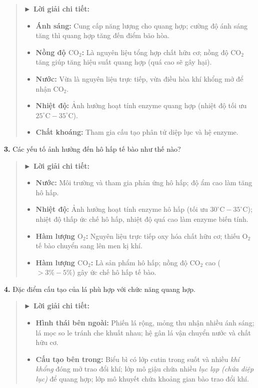 \documentclass[11pt,a4paper]{article}
\begin{document}
\begin{quote}\small
{\color{myBlue}\textbf{► Lời giải chi tiết:}}
\begin{itemize}[leftmargin=*,itemsep=1pt]
  \item \textbf{Ánh sáng:} Cung cấp năng lượng cho quang hợp; cường độ ánh sáng tăng thì quang hợp tăng đến điểm bão hòa.
  \item \textbf{Nồng độ $\text{CO}_2$:} Là nguyên liệu tổng hợp chất hữu cơ; nồng độ $\text{CO}_2$ tăng giúp tăng hiệu suất quang hợp (quá cao sẽ gây hại).
  \item \textbf{Nước:} Vừa là nguyên liệu trực tiếp, vừa điều hòa khí khổng mở để nhận $\text{CO}_2$.
  \item \textbf{Nhiệt độ:} Ảnh hưởng hoạt tính enzyme quang hợp (nhiệt độ tối ưu $25^\circ\text{C} - 35^\circ\text{C}$).
  \item \textbf{Chất khoáng:} Tham gia cấu tạo phân tử diệp lục và hệ enzyme.
\end{itemize}
\end{quote}

\textbf{3.} Các yếu tố ảnh hưởng đến hô hấp tế bào như thế nào?

\begin{quote}\small
{\color{myBlue}\textbf{► Lời giải chi tiết:}}
\begin{itemize}[leftmargin=*,itemsep=1pt]
  \item \textbf{Nước:} Môi trường và tham gia phản ứng hô hấp; độ ẩm cao làm tăng hô hấp.
  \item \textbf{Nhiệt độ:} Ảnh hưởng hoạt tính enzyme hô hấp (tối ưu $30^\circ\text{C} - 35^\circ\text{C}$); nhiệt độ thấp ức chế hô hấp, nhiệt độ quá cao làm enzyme biến tính.
  \item \textbf{Hàm lượng $\text{O}_2$:} Nguyên liệu trực tiếp oxy hóa chất hữu cơ; thiếu $\text{O}_2$ tế bào chuyển sang lên men kị khí.
  \item \textbf{Hàm lượng $\text{CO}_2$:} Là sản phẩm hô hấp; nồng độ $\text{CO}_2$ cao ($> 3\% - 5\%$) gây ức chế hô hấp tế bào.
\end{itemize}
\end{quote}

\textbf{4.} Đặc điểm cấu tạo của lá phù hợp với chức năng quang hợp.

\begin{quote}\small
{\color{myBlue}\textbf{► Lời giải chi tiết:}}
\begin{itemize}[leftmargin=*,itemsep=1pt]
  \item \textbf{Hình thái bên ngoài:} Phiến lá rộng, mỏng thu nhận nhiều ánh sáng; lá mọc so le tránh che khuất nhau; hệ gân lá vận chuyển nước và chất hữu cơ.
  \item \textbf{Cấu tạo bên trong:} Biểu bì có lớp cutin trong suốt và nhiều \textit{khí khổng} đóng mở trao đổi khí; lớp mô giậu chứa nhiều \textit{lục lạp (chứa diệp lục)} để quang hợp; lớp mô khuyết chứa khoảng gian bào trao đổi khí.
\end{itemize}
\end{quote}
\end{document}
